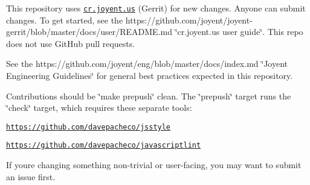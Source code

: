 This repository uses \href{https://cr.joyent.us}{\tt cr.\+joyent.\+us} (Gerrit) for new changes. Anyone can submit changes. To get started, see the https\+://github.com/joyent/joyent-\/gerrit/blob/master/docs/user/\+R\+E\+A\+D\+M\+E.\+md \char`\"{}cr.\+joyent.\+us user
guide\char`\"{}. This repo does not use Git\+Hub pull requests.

See the https\+://github.com/joyent/eng/blob/master/docs/index.\+md \char`\"{}\+Joyent Engineering
\+Guidelines\char`\"{} for general best practices expected in this repository.

Contributions should be \char`\"{}make prepush\char`\"{} clean. The \char`\"{}prepush\char`\"{} target runs the \char`\"{}check\char`\"{} target, which requires these separate tools\+:


\begin{DoxyItemize}
\item \href{https://github.com/davepacheco/jsstyle}{\tt https\+://github.\+com/davepacheco/jsstyle}
\item \href{https://github.com/davepacheco/javascriptlint}{\tt https\+://github.\+com/davepacheco/javascriptlint}
\end{DoxyItemize}

If you\textquotesingle{}re changing something non-\/trivial or user-\/facing, you may want to submit an issue first. 